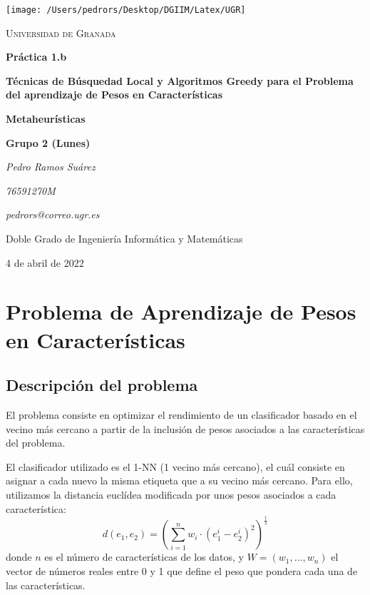 \documentclass[11pt,a4paper]{article}
\begin{document}
\begin{titlepage}
\centering
\texttt{[image: /Users/pedrors/Desktop/DGIIM/Latex/UGR]}\par\vspace{1cm}
{\scshape\LARGE Universidad de Granada \par}
\vspace{1cm}
{\Huge\bfseries Práctica 1.b\par}
{\Large\bfseries Técnicas de Búsquedad Local y Algoritmos Greedy para el Problema del aprendizaje de Pesos en Características\par}
\vspace{1.5cm}
{\huge\bfseries Metaheurísticas\par}
{\large\bfseries Grupo 2 (Lunes)\par}
\vspace{2cm}
{\Large\itshape Pedro Ramos Suárez\par}
{\large\itshape 76591270M\par}
{\large\itshape pedrors@correo.ugr.es\par}
\vfill
Doble Grado de Ingeniería Informática y Matemáticas
\vfill
{\large 4 de abril de 2022\par}
\author{A}
\end{titlepage}

\tableofcontents
\newpage
\section{Problema de Aprendizaje de Pesos en Características}

\subsection{Descripción del problema}

El problema consiste en optimizar el rendimiento de un clasificador basado en el vecino más cercano a partir de la inclusión de pesos asociados a las características del problema.

El clasificador utilizado es el 1-NN (1 vecino más cercano), el cuál consiste en asignar a cada nuevo la misma etiqueta que a su vecino más cercano. Para ello, utilizamos la distancia euclídea modificada por unos pesos asociados a cada característica:
$$d(e_{1}, e_{2}) = (\sum_{i=1}^{n} w_{i} \cdot (e_{1}^{i} - e_{2}^{i})^{2})^{\frac{1}{2}}$$
donde $n$ es el número de características de los datos, y $W = (w_{1}, \dots, w_{n})$ el vector de números reales entre 0 y 1 que define el peso que pondera cada una de las características.
\end{document}
